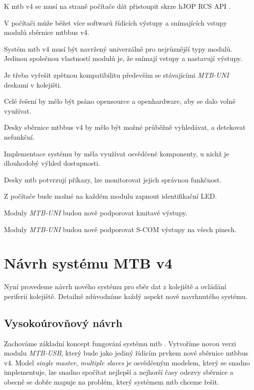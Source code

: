 \begin{compactenum}
\item K \gls{mtb} v4 se musí na straně počítače dát přistoupit skrze hJOP RCS
	API \cite{}.
\item V počítači může běžet více softwarů řídících výstupy a snímajících vstupy
	modulů sběrnice \gls{mtbbus} v4.
\item Systém \gls{mtb} v4 musí být navržený univerzálně pro nejrůznější typy
	modulů. Jedinou společnou vlastností modulů je, že snímají vstupy a nastavují
	výstupy.
\item Je třeba vyřešit zpětnou kompatibilitu především se stávajícími
	\textit{MTB-UNI} deskami v kolejišti.
\item Celé řešení by mělo být psáno opensource a openhardware, aby se dalo volně
	využívat.
\item Desky sběrnice \gls{mtbbus} v4 by mělo být možné průběžně vyhledávat,
	a detekovat nefunkční.
\item Implementace systému by měla využívat osvědčené komponenty, u nichž
	je dlouhodobý výhled dostupnosti.
\item Desky \gls{mtb} potvrzují příkazy, lze monitorovat jejich správnou funkčnost.
\item Z počítače bude možné na každém modulu zapnout identifikační LED.
\item Moduly \textit{MTB-UNI} budou nově podporovat kmitavé výstupy.
\item Moduly \textit{MTB-UNI} budou nově podporovat S-COM výstupy na všech pinech.
\end{compactenum}


\section{Návrh systému MTB v4}

Nyní provedeme návrh nového systému pro sběr dat z kolejiště a ovládání
periferií kolejiště. Detailně zdůvodníme každý aspekt nově navrhnutého systému.

\subsection{Vysokoúrovňový návrh}

Zachováme základní koncept fungování systému \gls{mtb} . Vytvoříme novou verzi modulu \textit{MTB-USB}, který bude
jako jediný řídicím prvkem nové sběrnice \gls{mtbbus} v4. Model \textit{single
master, multiple slaves} je osvědčeným modelem, který se snadno implementuje,
lze snadno spočítat nejlepší a nejhorší časy odezvy sběrnice a obecně se dobře
mapuje na problém, který systémem \gls{mtb} chceme řešit.


